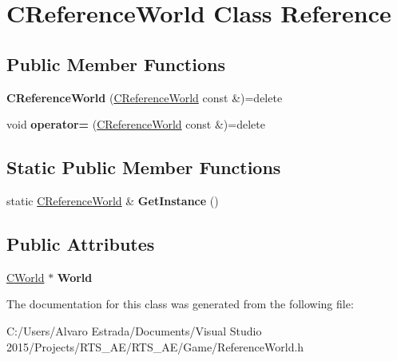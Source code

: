 \hypertarget{class_c_reference_world}{}\section{C\+Reference\+World Class Reference}
\label{class_c_reference_world}
\subsection*{Public Member Functions}
\begin{DoxyCompactItemize}
\item 
{\bfseries C\+Reference\+World} (\hyperlink{class_c_reference_world}{C\+Reference\+World} const \&)=delete\hypertarget{class_c_reference_world_ae5e7ba9348b3faaf8af9ae3ccf43dde6}{}\label{class_c_reference_world_ae5e7ba9348b3faaf8af9ae3ccf43dde6}

\item 
void {\bfseries operator=} (\hyperlink{class_c_reference_world}{C\+Reference\+World} const \&)=delete\hypertarget{class_c_reference_world_a253ade4bcccec38aa0a968e0463120ac}{}\label{class_c_reference_world_a253ade4bcccec38aa0a968e0463120ac}

\end{DoxyCompactItemize}
\subsection*{Static Public Member Functions}
\begin{DoxyCompactItemize}
\item 
static \hyperlink{class_c_reference_world}{C\+Reference\+World} \& {\bfseries Get\+Instance} ()\hypertarget{class_c_reference_world_a64767a09c548dfa9fc30e96b1c8f3698}{}\label{class_c_reference_world_a64767a09c548dfa9fc30e96b1c8f3698}

\end{DoxyCompactItemize}
\subsection*{Public Attributes}
\begin{DoxyCompactItemize}
\item 
\hyperlink{class_c_world}{C\+World} $\ast$ {\bfseries World}\hypertarget{class_c_reference_world_a81299eda2f10e5aa7f82870ac2ee705c}{}\label{class_c_reference_world_a81299eda2f10e5aa7f82870ac2ee705c}

\end{DoxyCompactItemize}


The documentation for this class was generated from the following file\+:\begin{DoxyCompactItemize}
\item 
C\+:/\+Users/\+Alvaro Estrada/\+Documents/\+Visual Studio 2015/\+Projects/\+R\+T\+S\+\_\+\+A\+E/\+R\+T\+S\+\_\+\+A\+E/\+Game/Reference\+World.\+h\end{DoxyCompactItemize}
